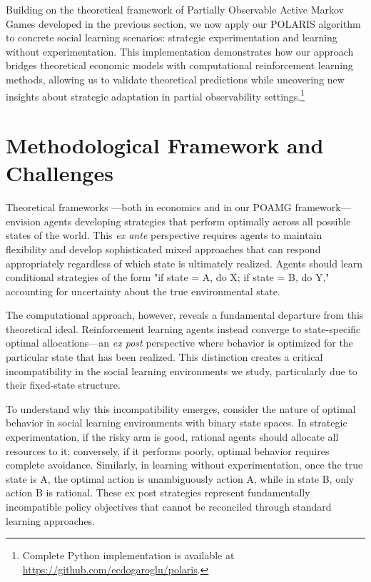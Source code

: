 Building on the theoretical framework of Partially Observable Active Markov Games developed in the previous section, we now apply our POLARIS algorithm to concrete social learning scenarios: strategic experimentation and learning without experimentation. This implementation demonstrates how our approach bridges theoretical economic models with computational reinforcement learning methods, allowing us to validate theoretical predictions while uncovering new insights about strategic adaptation in partial observability settings.\footnote{Complete Python implementation is available at \url{https://github.com/ecdogaroglu/polaris}.}

\section{Methodological Framework and Challenges}

Theoretical frameworks —both in economics and in our POAMG framework— envision agents developing strategies that perform optimally across all possible states of the world. This \emph{ex ante} perspective requires agents to maintain flexibility and develop sophisticated mixed approaches that can respond appropriately regardless of which state is ultimately realized. Agents should learn conditional strategies of the form "if state = A, do X; if state = B, do Y," accounting for uncertainty about the true environmental state. 

The computational approach, however, reveals a fundamental departure from this theoretical ideal. Reinforcement learning agents instead converge to state-specific optimal allocations—an \emph{ex post} perspective where behavior is optimized for the particular state that has been realized. This distinction creates a critical incompatibility in the social learning environments we study, particularly due to their fixed-state structure.

To understand why this incompatibility emerges, consider the nature of optimal behavior in social learning environments with binary state spaces. In strategic experimentation, if the risky arm is good, rational agents should allocate all resources to it; conversely, if it performs poorly, optimal behavior requires complete avoidance. Similarly, in learning without experimentation, once the true state is A, the optimal action is unambiguously action A, while in state B, only action B is rational. These ex post strategies represent fundamentally incompatible policy objectives that cannot be reconciled through standard learning approaches.

